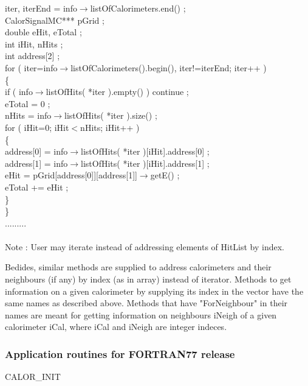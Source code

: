       iter, iterEnd = info$\rightarrow$listOfCalorimeters.end() ;\\   
   CalorSignalMC*** pGrid ;\\
   double eHit, eTotal ;\\
   int iHit, nHits ;\\
   int address[2] ; \\
   for ( iter=info$\rightarrow$listOfCalorimeters().begin(), iter!=iterEnd; iter++ ) \\
   \{ \\
      if ( info$\rightarrow$listOfHits( *iter ).empty() ) continue ; \\
      eTotal = 0 ; \\
      nHits = info$\rightarrow$listOfHits( *iter ).size() ; \\
      for ( iHit=0; iHit$<$nHits; iHit++ ) \\
      \{ \\
         address[0] = info$\rightarrow$listOfHits( *iter )[iHit].address[0] ; \\
	 address[1] = info$\rightarrow$listOfHits( *iter )[iHit].address[1] ; \\
	 eHit = pGrid[address[0]][address[1]]$\rightarrow$getE() ; \\
	 eTotal += eHit ;   \\
      \} \\
   \} \\
   ......... \\
   \\
Note : User may iterate instead of addressing elements of HitList by index. 

   Bedides, similar methods are supplied to address calorimeters and their
   neighbours (if any) by index (as in array) instead of iterator. Methods
   to get information on a given calorimeter by supplying its index in the
   vector have the same names as described above. Methods that have 
   "ForNeighbour" in their names are meant for getting information on
   neighbours iNeigh of a given calorimeter iCal, where iCal and iNeigh are
   integer indeces. 

\newpage
\subsubsection{Application routines for FORTRAN77 release}

\bigskip

\begin{center}
{CALOR\_INIT}
\end{center}

